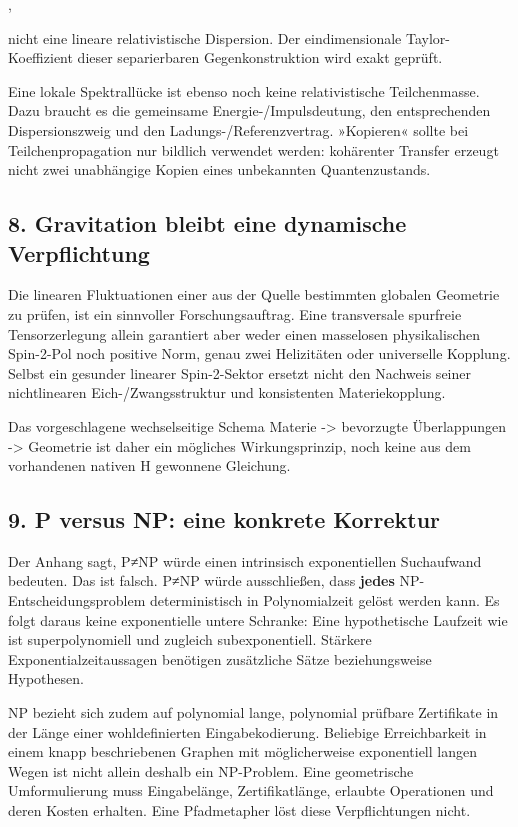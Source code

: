 ,

nicht eine lineare relativistische Dispersion. Der eindimensionale
Taylor-Koeffizient dieser separierbaren Gegenkonstruktion wird exakt
geprüft.

Eine lokale Spektrallücke ist ebenso noch keine relativistische
Teilchenmasse. Dazu braucht es die gemeinsame Energie-/Impulsdeutung,
den entsprechenden Dispersionszweig und den Ladungs-/Referenzvertrag.
»Kopieren« sollte bei Teilchenpropagation nur bildlich verwendet werden:
kohärenter Transfer erzeugt nicht zwei unabhängige Kopien eines
unbekannten Quantenzustands.

\subsection{8. Gravitation bleibt eine dynamische
Verpflichtung}\label{gravitation-bleibt-eine-dynamische-verpflichtung}

Die linearen Fluktuationen einer aus der Quelle bestimmten globalen
Geometrie zu prüfen, ist ein sinnvoller Forschungsauftrag. Eine
transversale spurfreie Tensorzerlegung allein garantiert aber weder
einen masselosen physikalischen Spin-2-Pol noch positive Norm, genau
zwei Helizitäten oder universelle Kopplung. Selbst ein gesunder linearer
Spin-2-Sektor ersetzt nicht den Nachweis seiner nichtlinearen
Eich-/Zwangsstruktur und konsistenten Materiekopplung.

Das vorgeschlagene wechselseitige Schema Materie -\textgreater{}
bevorzugte Überlappungen -\textgreater{} Geometrie ist daher ein
mögliches Wirkungsprinzip, noch keine aus dem vorhandenen nativen H
gewonnene Gleichung.

\subsection{9. P versus NP: eine konkrete
Korrektur}\label{p-versus-np-eine-konkrete-korrektur}

Der Anhang sagt, P≠NP würde einen intrinsisch exponentiellen Suchaufwand
bedeuten. Das ist falsch. P≠NP würde ausschließen, dass \textbf{jedes}
NP-Entscheidungsproblem deterministisch in Polynomialzeit gelöst werden
kann. Es folgt daraus keine exponentielle untere Schranke: Eine
hypothetische Laufzeit wie  ist
superpolynomiell und zugleich subexponentiell. Stärkere
Exponentialzeitaussagen benötigen zusätzliche Sätze beziehungsweise
Hypothesen.

NP bezieht sich zudem auf polynomial lange, polynomial prüfbare
Zertifikate in der Länge einer wohldefinierten Eingabekodierung.
Beliebige Erreichbarkeit in einem knapp beschriebenen Graphen mit
möglicherweise exponentiell langen Wegen ist nicht allein deshalb ein
NP-Problem. Eine geometrische Umformulierung muss Eingabelänge,
Zertifikatlänge, erlaubte Operationen und deren Kosten erhalten. Eine
Pfadmetapher löst diese Verpflichtungen nicht.

